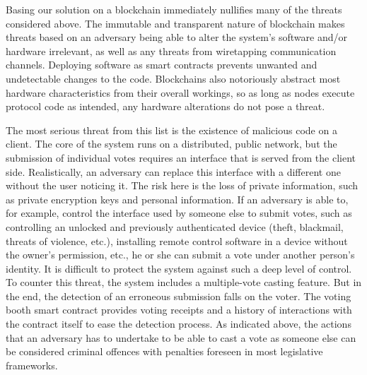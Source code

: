 \documentclass[../main.tex]{subfiles}
\begin{document}
Basing our solution on a blockchain immediately nullifies many of the threats considered above. The immutable and transparent nature of blockchain makes threats based on an adversary being able to alter the system's software and/or hardware irrelevant, as well as any threats from wiretapping communication channels. Deploying software as smart contracts prevents unwanted and undetectable changes to the code. Blockchains also notoriously abstract most hardware characteristics from their overall workings, so as long as nodes execute protocol code as intended, any hardware alterations do not pose a threat.
\par
The most serious threat from this list is the existence of malicious code on a client. The core of the system runs on a distributed, public network, but the submission of individual votes requires an interface that is served from the client side. Realistically, an adversary can replace this interface with a different one without the user noticing it. The risk here is the loss of private information, such as private encryption keys and personal information. If an adversary is able to, for example, control the interface used by someone else to submit votes, such as controlling an unlocked and previously authenticated device (theft, blackmail, threats of violence, etc.), installing remote control software in a device without the owner's permission, etc., he or she can submit a vote under another person's identity. It is difficult to protect the system against such a deep level of control. To counter this threat, the system includes a multiple-vote casting feature. But in the end, the detection of an erroneous submission falls on the voter. The voting booth smart contract provides voting receipts and a history of interactions with the contract itself to ease the detection process. As indicated above, the actions that an adversary has to undertake to be able to cast a vote as someone else can be considered criminal offences with penalties foreseen in most legislative frameworks.
\end{document}
